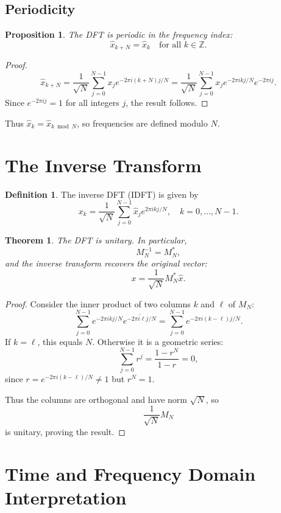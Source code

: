 \documentclass[12pt,oneside]{book}
\numberwithin{equation}{section}
\theoremstyle{definition}
\newtheorem{definition}{Definition}[section]
\theoremstyle{plain}
\newtheorem{theorem}{Theorem}[section]
\newtheorem{proposition}{Proposition}[section]
\theoremstyle{remark}
\newcommand{\Z}{\mathbb{Z}}
\begin{document}
\subsection{Periodicity}

\begin{proposition}
The DFT is periodic in the frequency index:
\[
\hat{x}_{k+N} = \hat{x}_k \quad \text{for all } k \in \Z.
\]
\end{proposition}

\begin{proof}
\[
\hat{x}_{k+N}
= \frac{1}{\sqrt{N}} \sum_{j=0}^{N-1} x_j e^{-2\pi i (k+N)j/N}
= \frac{1}{\sqrt{N}} \sum_{j=0}^{N-1} x_j e^{-2\pi i k j/N} e^{-2\pi i j}.
\]
Since $e^{-2\pi i j} = 1$ for all integers $j$, the result follows.
\end{proof}

Thus $\hat{x}_k = \hat{x}_{k \bmod N}$, so frequencies are defined modulo $N$.

\section{The Inverse Transform}

\begin{definition}
The inverse DFT (IDFT) is given by
\[
x_k = \frac{1}{\sqrt{N}} \sum_{j=0}^{N-1} \hat{x}_j e^{2\pi i k j / N}, \quad k = 0, \ldots, N-1.
\]
\end{definition}

\begin{theorem}
The DFT is unitary. In particular,
\[
M_N^{-1} = M_N^*,
\]
and the inverse transform recovers the original vector:
\[
x = \frac{1}{\sqrt{N}} M_N^* \hat{x}.
\]
\end{theorem}

\begin{proof}
Consider the inner product of two columns $k$ and $\ell$ of $M_N$:
\[
\sum_{j=0}^{N-1} e^{-2\pi i k j/N} \overline{e^{-2\pi i \ell j/N}}
= \sum_{j=0}^{N-1} e^{-2\pi i (k-\ell)j/N}.
\]
If $k = \ell$, this equals $N$. Otherwise it is a geometric series:
\[
\sum_{j=0}^{N-1} r^j = \frac{1-r^N}{1-r} = 0,
\]
since $r = e^{-2\pi i (k-\ell)/N} \neq 1$ but $r^N = 1$.

Thus the columns are orthogonal and have norm $\sqrt{N}$, so
\[
\frac{1}{\sqrt{N}} M_N
\]
is unitary, proving the result.
\end{proof}

\section{Time and Frequency Domain Interpretation}
\end{document}
